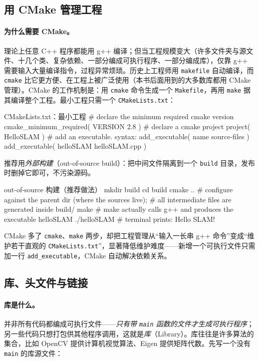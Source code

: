 \subsection{用 CMake 管理工程}
\label{sec:intro-cmake}
\paragraph{为什么需要 CMake。}
理论上任意 C++ 程序都能用 g++ 编译；但当工程规模变大（许多文件夹与源文件、十几个类、复杂依赖、一部分编成可执行程序、一部分编成库），仅靠 g++ 需要输入大量编译指令，过程异常烦琐。历史上工程师用 \texttt{makefile} 自动编译，而 \texttt{cmake} 比它更方便、在工程上被广泛使用（本书后面用到的大多数库都用 CMake 管理）。CMake 的工作机制是：用 \texttt{cmake} 命令生成一个 \texttt{Makefile}，再用 \texttt{make} 据其编译整个工程。最小工程只需一个 \texttt{CMakeLists.txt}：

\begin{codebox}[text]{CMakeLists.txt：最小工程}
# declare the minimum required cmake version
cmake_minimum_required( VERSION 2.8 )
# declare a cmake project
project( HelloSLAM )
# add an executable.  syntax: add_executable( name source-files )
add_executable( helloSLAM helloSLAM.cpp )
\end{codebox}

\noindent 推荐用\emph{外部构建}（out-of-source build）：把中间文件隔离到一个 \texttt{build} 目录，发布时删掉它即可，不污染源码。

\begin{codebox}[bash]{out-of-source 构建（推荐做法）}
mkdir build
cd build
cmake ..     # configure against the parent dir (where the sources live);
             # all intermediate files are generated inside build/
make         # make actually calls g++ and produces the executable helloSLAM
./helloSLAM  # terminal prints: Hello SLAM!
\end{codebox}

\noindent CMake 多了 \texttt{cmake}、\texttt{make} 两步，却把工程管理从“输入一长串 g++ 命令”变成“维护若干直观的 \texttt{CMakeLists.txt}”，显著降低维护难度——新增一个可执行文件只需加一行 \texttt{add\_executable}，CMake 自动解决依赖关系。

\subsection{库、头文件与链接}
\label{sec:intro-lib}
\paragraph{库是什么。}
并非所有代码都编成可执行文件——\emph{只有带 \texttt{main} 函数的文件才生成可执行程序}；另一些代码只想打包供其他程序调用，这就是\emph{库}（Library）。库往往是许多算法的集合，比如 OpenCV 提供计算机视觉算法、Eigen 提供矩阵代数。先写一个没有 \texttt{main} 的库源文件：

